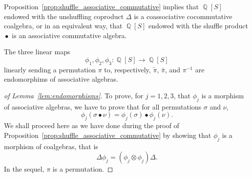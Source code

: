 \documentclass[a4paper]{llncs}
\DeclareMathOperator{\QQ}{\mathbb{Q}}
\DeclareMathOperator{\SHUFFLE}{\bullet}
\begin{document}
Proposition~\ref{prop:shuffle_associative_commutative} implies that
$\QQ[S]$ endowed with the unshuffling coproduct $\Delta$ is a
coassociative cocommutative coalgebra, or in an equivalent way, that
$\QQ[S]$ endowed with the shuffle product $\SHUFFLE$ is an associative
commutative algebra.
\medskip

\begin{lemma} \label{lem:endomorphisms}
    The three linear maps
    \begin{equation}
        \phi_1, \phi_2, \phi_3 : \QQ[S] \to \QQ[S]
    \end{equation}
    linearly sending a permutation $\pi$ to, respectively,
    $\widetilde{\pi}$, $\bar \pi$, and $\pi^{-1}$ are endomorphims of
    associative algebras.
\end{lemma}
\begin{proof}[of Lemma~\ref{lem:endomorphisms}]
    To prove, for $j = 1, 2, 3$, that $\phi_j$ is a morphism of
    associative algebras, we have to prove that for all permutations
    $\sigma$ and $\nu$,
    \begin{equation}
        \phi_j(\sigma \SHUFFLE \nu) =
        \phi_j(\sigma) \SHUFFLE \phi_j(\nu).
    \end{equation}
    We shall proceed here as we have done during the proof of
    Proposition~\ref{prop:shuffle_associative_commutative} by showing
    that $\phi_j$ is a morphism of coalgebras, that is
    \begin{equation}
        \Delta \phi_j = (\phi_j \otimes \phi_j) \Delta.
    \end{equation}
    In the sequel, $\pi$ is a permutation.
    \smallskip


\end{proof}
\end{document}
